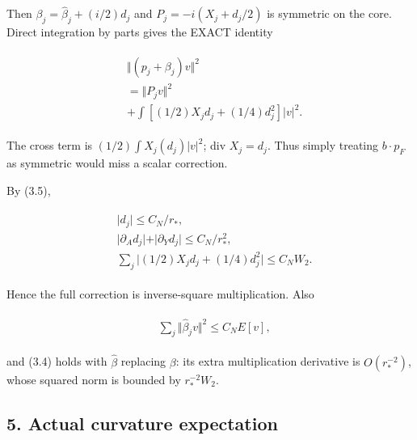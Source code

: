 Then \(\beta _{j}=\widehat{\beta}_{j}+(i/2)d_{j}\) and
\(P_{j}=-i(X_{j}+d_{j}/2)\) is symmetric on the core. Direct integration
by parts gives the EXACT identity

\begin{gather*}
\begin{aligned}
& \Vert (p_{j}+\beta _{j})v\Vert ^{2} \\
& =\Vert P_{j} v\Vert ^{2} \\
& + \int  [(1/2)X_{j} d_{j}+(1/4)d_{j}^{2}]\vert v\vert ^{2}.
\end{aligned}\tag{4.1}
\end{gather*}

The cross term is \((1/2) \int  X_{j}(d_{j})\vert v\vert ^{2}\); div
\(X_{j}=d_{j}\). Thus simply treating \(b \cdot  p_{F}\) as symmetric
would miss a scalar correction.

By (3.5),

\begin{gather*}
\begin{aligned}
& \vert d_{j}\vert  \le  C_{N}/r_{*}, \\
& \vert \partial _{A} d_{j}\vert +\vert \partial _{Y} d_{j}\vert  \le  C_{N}/r_{*}^{2}, \\
& \sum _{j} \vert (1/2)X_{j} d_{j}+(1/4)d_{j}^{2}\vert  \le  C_{N} W_{2}.
\end{aligned}\tag{4.2}
\end{gather*}

Hence the full correction is inverse-square multiplication. Also

\begin{gather*}
\begin{aligned}
& \sum _{j} \Vert \widehat{\beta}_{j} v\Vert ^{2} \le  C_{N} E[v],
\end{aligned}\tag{4.3}
\end{gather*}

and (3.4) holds with \(\widehat{\beta}\) replacing \(\beta\): its extra
multiplication derivative is \(O(r_{*}^{-2})\), whose squared norm is
bounded by \(r_{*}^{-2} W_{2}\).

\subsection{5. Actual curvature
expectation}\label{g-actual-curvature-expectation}

